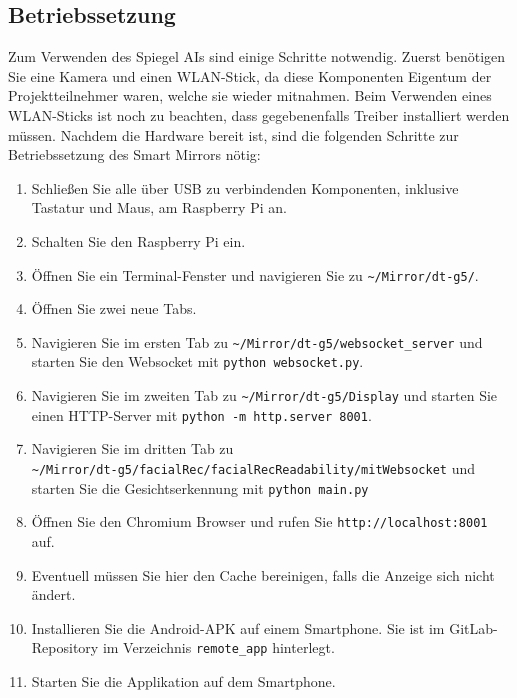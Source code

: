 \subsection{Betriebssetzung}
Zum Verwenden des Spiegel AIs sind einige Schritte notwendig. Zuerst benötigen Sie eine Kamera und einen WLAN-Stick, da diese Komponenten Eigentum der Projektteilnehmer waren, welche sie wieder mitnahmen. Beim Verwenden eines WLAN-Sticks ist noch zu beachten, dass gegebenenfalls Treiber installiert werden müssen. Nachdem die Hardware bereit ist, sind die folgenden Schritte zur Betriebssetzung des Smart Mirrors nötig:
\begin{enumerate}
	\item Schließen Sie alle über USB zu verbindenden Komponenten, inklusive Tastatur und Maus, am Raspberry Pi an.
	\item Schalten Sie den Raspberry Pi ein.
	\item Öffnen Sie ein Terminal-Fenster und navigieren Sie zu \verb|~/Mirror/dt-g5/|.
	\item Öffnen Sie zwei neue Tabs.
	\item Navigieren Sie im ersten Tab zu \verb|~/Mirror/dt-g5/websocket_server| und starten Sie den Websocket mit \texttt{python websocket.py}.
	\item Navigieren Sie im zweiten Tab zu \verb|~/Mirror/dt-g5/Display| und starten Sie einen HTTP-Server mit \texttt{python -m http.server 8001}.
	\item Navigieren Sie im dritten Tab zu \\ \verb|~/Mirror/dt-g5/facialRec/facialRecReadability/mitWebsocket| und starten Sie die Gesichtserkennung mit \texttt{python main.py}
	\item Öffnen Sie den Chromium Browser und rufen Sie \texttt{http://localhost:8001} auf.
	\item Eventuell müssen Sie hier den Cache bereinigen, falls die Anzeige sich nicht ändert.
	\item Installieren Sie die Android-APK auf einem Smartphone. Sie ist im GitLab-Repository im Verzeichnis \texttt{remote\_app} hinterlegt.
	\item Starten Sie die Applikation auf dem Smartphone.
\end{enumerate}
